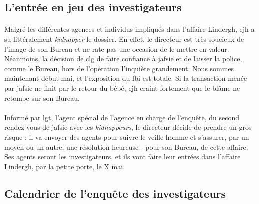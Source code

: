 





\subsection{L'entrée en jeu des investigateurs}
\paragraph{} Malgré les différentes agences et individus impliqués dans l'affaire Lindergh, \gls{ejh} a su littéralement \emph{kidnapper} le dossier. En 
effet, le directeur est très soucieux de l'image de son Bureau et ne rate pas une occasion de le mettre en valeur. Néanmoins, la décision de \gls{clg} de
faire confiance à \gls{jafsie} et de laisser la police, comme le Bureau, hors de l'opération l'inquiète grandement. Nous sommes maintenant début mai, et
l'exposition du \gls{fbi} est totale. Si la transaction menée par \gls{jafsie} ne finit par le retour du bébé, \gls{ejh} craint fortement que le blâme ne
retombe sur son Bureau.
\paragraph{} Informé par \gls{lgt}, l'agent spécial de l'agence en charge de l'enquête, du second rendez vous de \gls{jafsie} avec les \emph{kidnappeurs},
le directeur décide de prendre un gros risque : il va envoyer des agents pour suivre le veille homme et s'assurer, par un moyen ou un autre, une résolution
heureuse - pour son Bureau, de cette affaire. Ses agents seront les investigateurs, et ils vont faire leur entrées dans l'affaire Lindergh, par la petite porte, le X mai.

\subsection{Calendrier de l'enquête des investigateurs}
